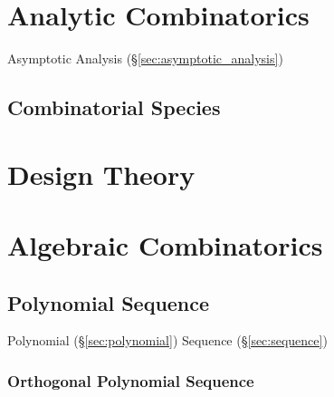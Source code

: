 \section{Analytic Combinatorics}\label{sec:analytic_combinatorics}
\cite{flajolet-sedgewick09}

Asymptotic Analysis (\S\ref{sec:asymptotic_analysis})



\subsection{Combinatorial Species}\label{sec:combinatorial_species}



\section{Design Theory}\label{sec:combinatorial_design}

\section{Algebraic Combinatorics}\label{sec:algebraic_combinatorics}

\subsection{Polynomial Sequence}\label{sec:polynomial_sequence}

Polynomial (\S\ref{sec:polynomial}) Sequence (\S\ref{sec:sequence})



\subsubsection{Orthogonal Polynomial Sequence}
\label{sec:orthogonal_polynomial_sequence}

